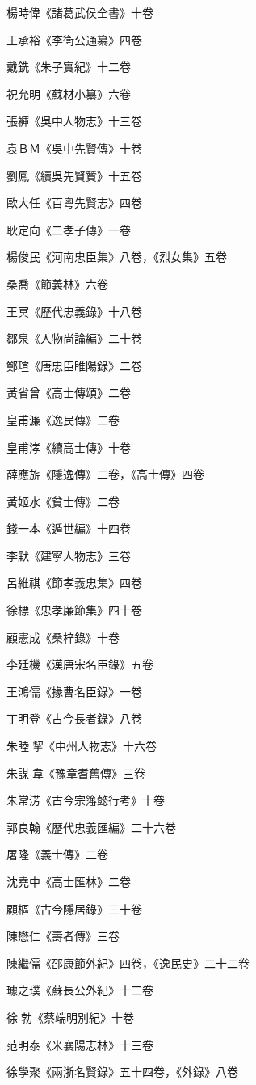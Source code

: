 楊時偉《諸葛武侯全書》十卷

王承裕《李衛公通纂》四卷

戴銑《朱子實紀》十二卷

祝允明《蘇材小纂》六卷

張褲《吳中人物志》十三卷

袁ＢＭ《吳中先賢傳》十卷

劉鳳《續吳先賢贊》十五卷

歐大任《百粵先賢志》四卷

耿定向《二孝子傳》一卷

楊俊民《河南忠臣集》八卷，《烈女集》五卷

桑喬《節義林》六卷

王冥《歷代忠義錄》十八卷

鄒泉《人物尚論編》二十卷

鄭瑄《唐忠臣睢陽錄》二卷

黃省曾《高士傳頌》二卷

皇甫濂《逸民傳》二卷

皇甫涍《續高士傳》十卷

薛應旂《隱逸傳》二卷，《高士傳》四卷

黃姬水《貧士傳》二卷

錢一本《遁世編》十四卷

李默《建寧人物志》三卷

呂維祺《節孝義忠集》四卷

徐標《忠孝廉節集》四十卷

顧憲成《桑梓錄》十卷

李廷機《漢唐宋名臣錄》五卷

王鴻儒《掾曹名臣錄》一卷

丁明登《古今長者錄》八卷

朱睦挈《中州人物志》十六卷

朱謀韋《豫章耆舊傳》三卷

朱常淓《古今宗籓懿行考》十卷

郭良翰《歷代忠義匯編》二十六卷

屠隆《義士傳》二卷

沈堯中《高士匯林》二卷

顧樞《古今隱居錄》三十卷

陳懋仁《壽者傳》三卷

陳繼儒《邵康節外紀》四卷，《逸民史》二十二卷

璩之璞《蘇長公外紀》十二卷

徐勃《蔡端明別紀》十卷

范明泰《米襄陽志林》十三卷

徐學聚《兩浙名賢錄》五十四卷，《外錄》八卷

